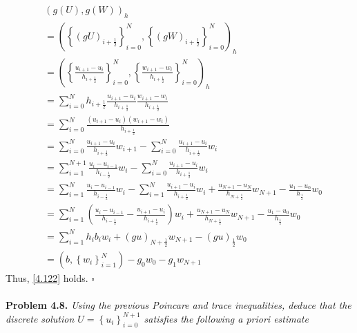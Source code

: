 \documentclass[a4paper]{article}
\numberwithin{equation}{section}
\begin{document}
\begin{align}
&{\left( {g\left( U \right),g\left( W \right)} \right)_h} \\&= {\left( {\left\{ {{{\left( {gU} \right)}_{i + \frac{1}{2}}}} \right\}_{i = 0}^N,\left\{ {{{\left( {gW} \right)}_{i + \frac{1}{2}}}} \right\}_{i = 0}^N} \right)_h}\\
& = {\left( {\left\{ {\frac{{{u_{i + 1}} - {u_i}}}{{{h_{i + \frac{1}{2}}}}}} \right\}_{i = 0}^N,\left\{ {\frac{{{w_{i + 1}} - {w_i}}}{{{h_{i + \frac{1}{2}}}}}} \right\}_{i = 0}^N} \right)_h}\\
& = \sum\limits_{i = 0}^N {{h_{i + \frac{1}{2}}}\frac{{{u_{i + 1}} - {u_i}}}{{{h_{i + \frac{1}{2}}}}}\frac{{{w_{i + 1}} - {w_i}}}{{{h_{i + \frac{1}{2}}}}}} \\
& = \sum\limits_{i = 0}^N {\frac{{\left( {{u_{i + 1}} - {u_i}} \right)\left( {{w_{i + 1}} - {w_i}} \right)}}{{{h_{i + \frac{1}{2}}}}}} \\
& = \sum\limits_{i = 0}^N {\frac{{{u_{i + 1}} - {u_i}}}{{{h_{i + \frac{1}{2}}}}}{w_{i + 1}}}  - \sum\limits_{i = 0}^N {\frac{{{u_{i + 1}} - {u_i}}}{{{h_{i + \frac{1}{2}}}}}{w_i}} \\
& = \sum\limits_{i = 1}^{N + 1} {\frac{{{u_i} - {u_{i - 1}}}}{{{h_{i - \frac{1}{2}}}}}{w_i}}  - \sum\limits_{i = 0}^N {\frac{{{u_{i + 1}} - {u_i}}}{{{h_{i + \frac{1}{2}}}}}{w_i}} \\
& = \sum\limits_{i = 1}^N {\frac{{{u_i} - {u_{i - 1}}}}{{{h_{i - \frac{1}{2}}}}}{w_i}}  - \sum\limits_{i = 1}^N {\frac{{{u_{i + 1}} - {u_i}}}{{{h_{i + \frac{1}{2}}}}}{w_i}}  + \frac{{{u_{N + 1}} - {u_N}}}{{{h_{N + \frac{1}{2}}}}}{w_{N + 1}} - \frac{{{u_1} - {u_0}}}{{{h_{\frac{1}{2}}}}}{w_0}\\
& = \sum\limits_{i = 1}^N {\left( {\frac{{{u_i} - {u_{i - 1}}}}{{{h_{i - \frac{1}{2}}}}} - \frac{{{u_{i + 1}} - {u_i}}}{{{h_{i + \frac{1}{2}}}}}} \right){w_i}}  + \frac{{{u_{N + 1}} - {u_N}}}{{{h_{N + \frac{1}{2}}}}}{w_{N + 1}} - \frac{{{u_1} - {u_0}}}{{{h_{\frac{1}{2}}}}}{w_0}\\
& = \sum\limits_{i = 1}^N {{h_i}{b_i}{w_i}}  + {\left( {gu} \right)_{N + \frac{1}{2}}}{w_{N + 1}} - {\left( {gu} \right)_{\frac{1}{2}}}{w_0}\\
& = \left( {b,\left\{ w_i \right\}_{i = 1}^N} \right) - {g_0}{w_0} - {g_1}{w_{N + 1}}
\end{align}
Thus, \eqref{4.122} holds. \hfill $\square$\\
\\
\textbf{Problem 4.8.} \textit{Using the previous Poincare and trace inequalities, deduce that the discrete solution $U = \left\{ {{u_i}} \right\}_{i = 0}^{N + 1}$ satisfies the following a priori estimate}
\end{document}
